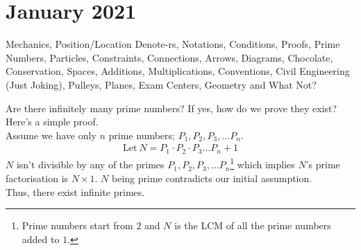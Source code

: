 \section{January 2021}
    {\sffamily\large{Mechanics, Position/Location Denote-rs, Notations, Conditions, Proofs, Prime Numbers, Particles, Constraints, Connections, Arrows, Diagrams, Chocolate, Conservation, Spaces, Additions, Multiplications, Conventions, Civil Engineering (Just Joking), Pulleys, Planes, Exam Centers, Geometry and What Not? }}
\thispagestyle{empty}
\newpage
\begin{mathbox}{}
{Are there infinitely many prime numbers? If yes, how do we prove they exist?\\
Here's a simple proof.\\
{Assume} we have only $n$ prime numbers; $P_1, P_2, P_3, \dots P_n$.
\begin{align*}
\text{Let}~N = P_1 \cdot P_2 \cdot P_3 \dots P_n + 1
\end{align*}
$N$ {isn't divisible} by any of the primes $P_1, P_2, P_3, \dots P_n$\footnote{Prime numbers start from $2$ and $N$ is the LCM of all the prime numbers added to $1$.}  which implies $N$'s {prime factorisation} is $N \times 1$. $N$ being prime {contradicts} our initial assumption.\\
Thus, there exist infinite primes.}
\end{mathbox}
